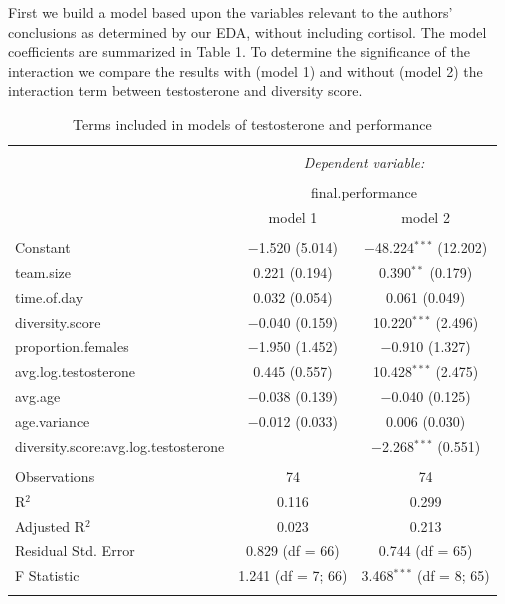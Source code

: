\documentclass[]{article}
\begin{document}
First we build a model based upon the variables relevant to the authors'
conclusions as determined by our EDA, without including cortisol. The
model coefficients are summarized in Table 1. To determine the
significance of the interaction we compare the results with (model 1)
and without (model 2) the interaction term between testosterone and
diversity score.

\begin{table}[!htbp] \centering 
  \caption{Terms included in models of testosterone and performance} 
  \label{tab:regression} 
\small 
\begin{tabular}{@{\extracolsep{1pt}}lcc} 
\\[-1.8ex]\hline 
\hline \\[-1.8ex] 
 & \multicolumn{2}{c}{\textit{Dependent variable:}} \\ 
\cline{2-3} 
\\[-1.8ex] & \multicolumn{2}{c}{final.performance} \\ 
 & model 1 & model 2 \\ 
\hline \\[-1.8ex] 
 Constant & $-$1.520 (5.014) & $-$48.224$^{***}$ (12.202) \\ 
  team.size & 0.221 (0.194) & 0.390$^{**}$ (0.179) \\ 
  time.of.day & 0.032 (0.054) & 0.061 (0.049) \\ 
  diversity.score & $-$0.040 (0.159) & 10.220$^{***}$ (2.496) \\ 
  proportion.females & $-$1.950 (1.452) & $-$0.910 (1.327) \\ 
  avg.log.testosterone & 0.445 (0.557) & 10.428$^{***}$ (2.475) \\ 
  avg.age & $-$0.038 (0.139) & $-$0.040 (0.125) \\ 
  age.variance & $-$0.012 (0.033) & 0.006 (0.030) \\ 
  diversity.score:avg.log.testosterone &  & $-$2.268$^{***}$ (0.551) \\ 
 \hline \\[-1.8ex] 
Observations & 74 & 74 \\ 
R$^{2}$ & 0.116 & 0.299 \\ 
Adjusted R$^{2}$ & 0.023 & 0.213 \\ 
Residual Std. Error & 0.829 (df = 66) & 0.744 (df = 65) \\ 
F Statistic & 1.241 (df = 7; 66) & 3.468$^{***}$ (df = 8; 65) \\ 
\hline 
\hline \\[-1.8ex] 
\end{tabular} 
\end{table}
\end{document}
